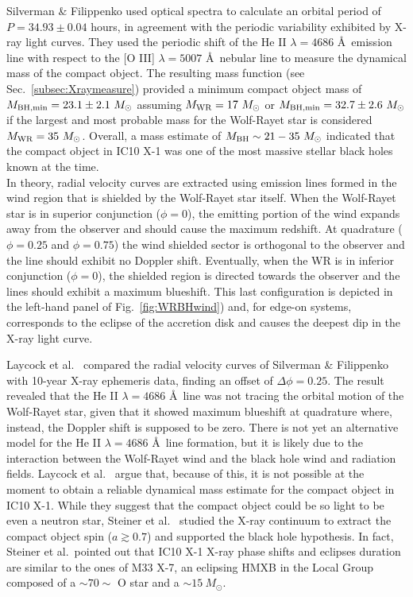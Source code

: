 \documentclass[a4paper,titlepage]{book}     	%
\newcommand{\sun}{\ensuremath{_\odot}}
\newcommand{\msun}{\ensuremath{M\sun}}
\newcommand{\mwr}{\ensuremath{M_\textup{WR}}}
\newcommand{\mbh}{\ensuremath{M_\textup{BH}}}
\begin{document}
Silverman \& Filippenko used optical spectra to calculate an orbital period of $P = 34.93 \pm 0.04$ hours, in agreement with the periodic variability exhibited by X-ray light curves. They used the periodic shift of the He II $\lambda=4686$ \AA ~emission line with respect to the [O III] $\lambda=5007$ \AA ~nebular line to measure the dynamical mass of the compact object. The resulting mass function (see Sec.\ \ref{subsec:Xraymeasure}) provided a minimum compact object mass of $M_{\rm BH, min} = 23.1 \pm 2.1~\msun$ assuming $\mwr = 17~\msun$ or $M_{\rm BH, min} = 32.7 \pm 2.6~\msun$ if the largest and most probable mass for the Wolf-Rayet star is considered $\mwr = 35~\msun$. Overall, a mass estimate of $\mbh \sim 21-35~\msun$ indicated that the compact object in IC10 X-1 was one of the most massive stellar black holes known at the time. \\

In theory, radial velocity curves are extracted using emission lines formed in the wind region that is shielded by the Wolf-Rayet star itself. When the Wolf-Rayet star is in superior conjunction ($\phi = 0$), the emitting portion of the wind expands away from the observer and should cause the maximum redshift. At quadrature ($\phi = 0.25$ and $\phi = 0.75$) the wind shielded sector is orthogonal to the observer and the line should exhibit no Doppler shift. Eventually, when the WR is in inferior conjunction ($\phi = 0$), the shielded region is directed towards the observer and the lines should exhibit a maximum blueshift. This last configuration is depicted in the left-hand panel of Fig.\ \ref{fig:WRBHwind}) and, for edge-on systems, corresponds to the eclipse of the accretion disk and causes the deepest dip in the X-ray light curve.

Laycock et al.\ \cite{laycock2015_IC10X1_measuredshift} compared the radial velocity curves of Silverman \& Filippenko with 10-year X-ray ephemeris data, finding an offset of $\Delta \phi = 0.25$. The result revealed that the He II $\lambda=4686$ \AA~line was not tracing the orbital motion of the Wolf-Rayet star, given that it showed maximum blueshift at quadrature  where, instead, the Doppler shift is supposed to be zero. There is not yet an alternative model for the He II $\lambda=4686$ \AA ~line formation, but it is likely due to the interaction between the Wolf-Rayet wind and the black hole wind and radiation fields. Laycock et al.\ \cite{ICX10X-1_Laycock2015_revisited} argue that, because of this, it is not possible at the moment to obtain a reliable dynamical mass estimate for the compact object in IC10 X-1. While they suggest that the compact object could be so light to be even a neutron star, Steiner et al.\ \cite{IC10X-1?Steiner2016spinBH} studied the X-ray continuum to extract the compact object spin ($a \gtrsim 0.7$) and supported the black hole hypothesis. In fact, Steiner et al.\ pointed out that IC10 X-1 X-ray phase shifts and eclipses duration are similar to the ones of M33 X-7, an eclipsing HMXB in the Local Group composed of a $\sim 70\sim$ O star and a $\sim 15~\msun$.
\end{document}

